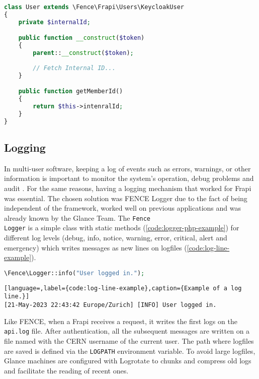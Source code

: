 \begin{lstlisting}[language=PHP,label={code:custom-props-php},caption={Custom \texttt{User} class with additional properties.}]
class User extends \Fence\Frapi\Users\KeycloakUser
{
	private $internalId;

	public function __construct($token)
	{
		parent::__construct($token);
		
		// Fetch Internal ID...
	}

    public function getMemberId()
    {
        return $this->intenralId;
    }
}
\end{lstlisting}


\subsection{Logging}

In multi-user software, keeping a log of events such as errors, warnings, or other information is important to monitor the system's operation, debug problems and audit \cite{logging-wikipedia}. For the same reasons, having a logging mechanism that worked for Frapi was essential. The chosen solution was FENCE Logger due to the fact of being independent of the framework, worked well on previous applications and was already known by the Glance Team. The \texttt{Fence\\Logger} is a simple class with static methods (\autoref{code:logger-php-example}) for different log levels (debug, info, notice, warning, error, critical, alert and emergency) which writes messages as new lines on logfiles (\autoref{code:log-line-example}).

\begin{lstlisting}[language=PHP,label={code:logger-php-example},caption={How to write logs on Frapi v1.}]
\Fence\Logger::info("User logged in.");
\end{lstlisting}

\begin{lstlisting}[language=,label={code:log-line-example},caption={Example of a log line.}]
[21-May-2023 22:43:42 Europe/Zurich] [INFO] User logged in.
\end{lstlisting}

Like FENCE, when a Frapi receives a request, it writes the first logs on the \texttt{api.log} file. After authentication, all the subsequent messages are written on a file named with the CERN username of the current user. The path where logfiles are saved is defined via the \texttt{LOG\textunderscore PATH} environment variable. To avoid large logfiles, Glance machines are configured with Logrotate \cite{logrotate-man} to chunks and compress old logs and facilitate the reading of recent ones.

